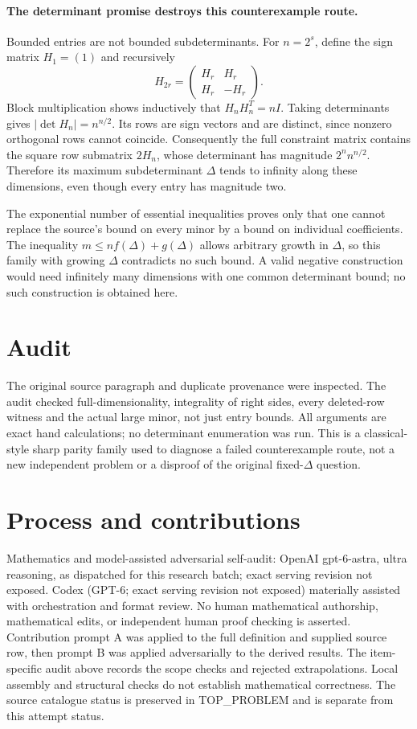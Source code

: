 \documentclass[11pt]{article}
\begin{document}
\paragraph{The determinant promise destroys this counterexample route.}
Bounded entries are not bounded subdeterminants. For $n=2^s$,
define the sign matrix $H_1=(1)$ and recursively
\[
H_{2r}=\begin{pmatrix}H_r&H_r\\H_r&-H_r\end{pmatrix}.
\]
Block multiplication shows inductively that
$H_nH_n^T=nI$. Taking determinants gives
$|\det H_n|=n^{n/2}$. Its rows are sign vectors and are
distinct, since nonzero orthogonal rows cannot coincide. Consequently
the full constraint matrix contains the square row submatrix $2H_n$,
whose determinant has magnitude $2^n n^{n/2}$.
Therefore its maximum subdeterminant $\Delta$ tends to infinity
along these dimensions, even though every entry has magnitude two.

The exponential number of essential inequalities proves only that
one cannot replace the source's bound on every minor by a bound
on individual coefficients. The inequality $m\le nf(\Delta)+g(\Delta)$
allows arbitrary growth in $\Delta$, so this family with growing
$\Delta$ contradicts no such bound. A valid negative construction
would need infinitely many dimensions with one common determinant
bound; no such construction is obtained here.

\section{Audit}
The original source paragraph and duplicate provenance were inspected.
The audit checked full-dimensionality, integrality of right sides,
every deleted-row witness and the actual large minor, not just
entry bounds. All arguments are exact hand calculations; no determinant
enumeration was run. This is a classical-style sharp parity family
used to diagnose a failed counterexample route, not a new independent
problem or a disproof of the original fixed-$\Delta$ question.

\section{Process and contributions}
Mathematics and model-assisted adversarial self-audit: OpenAI gpt-6-astra, ultra reasoning, as dispatched for this research batch; exact serving revision not exposed. Codex (GPT-6; exact serving revision not exposed) materially assisted with orchestration and format review. No human mathematical authorship, mathematical edits, or independent human proof checking is asserted.
Contribution prompt A was applied to the full definition and supplied source row, then prompt B was applied adversarially to the derived results. The item-specific audit above records the scope checks and rejected extrapolations. Local assembly and structural checks do not establish mathematical correctness. The source catalogue status is preserved in TOP\_PROBLEM and is separate from this attempt status.
\end{document}

